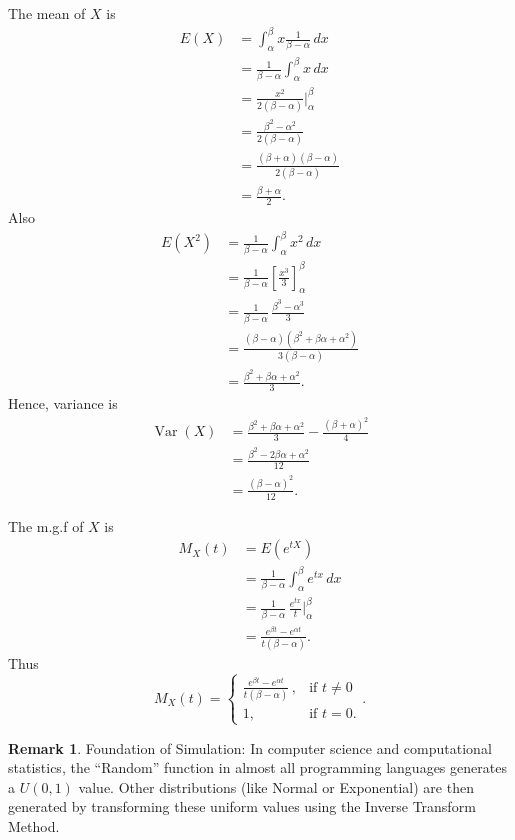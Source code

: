 \documentclass[12pt,a4paper]{report}
\theoremstyle{definition}
\newtheorem{remark}[thm]{Remark}
\theoremstyle{plain}
\theoremstyle{definition}
\begin{document}
The mean of $X$ is
\begin{align*}
E(X) &=\int^{\beta}_{\alpha}x\frac{1}{\beta -\alpha}\, dx\\
&=\frac{1}{\beta -\alpha}\int^{\beta}_{\alpha}x\, dx\\
&=\frac{x^2}{2(\beta -\alpha)}\Bigg|_{\alpha}^{\beta}\\
&=\frac{\beta^2-\alpha^2}{2(\beta -\alpha)}\\
&=\frac{(\beta +\alpha)(\beta-\alpha)}{2(\beta-\alpha)}\\
& =\frac{\beta +\alpha}{2}.
\end{align*}
Also
\begin{align*}
E(X^2) & = \frac{1}{\beta - \alpha}\int^{\beta}_{\alpha} x^2\,dx\\
& = \frac{1}{\beta - \alpha}\left[\frac{x^3}{3}\right]^{\beta}_{\alpha}\\
& = \frac{1}{\beta-\alpha}\, \frac{\beta^3-\alpha^3}{3}\\
& = \frac{(\beta - \alpha)(\beta^2 + \beta \alpha + \alpha^2)}{3(\beta - \alpha)}\\
& = \frac{\beta^2 + \beta \alpha + \alpha^2}{3}.
\end{align*}
Hence, variance is
\begin{align*}
\operatorname{Var}(X) & = \frac{\beta^2 + \beta \alpha + \alpha^2}{3}- \frac{(\beta + \alpha)^2}{4}\\
& = \frac{\beta^2 - 2\beta \alpha + \alpha^2}{12}\\
& = \frac{(\beta - \alpha)^2}{12}.
\end{align*}

The m.g.f of $X$ is 
\begin{align*}
M_X(t) &=E\left(e^{tX}\right)\\
&=\frac{1}{\beta -\alpha}\int^{\beta}_{\alpha}e^{tx}\, dx\\
& =\frac{1}{\beta -\alpha}\,\frac{e^{tx}}{t}\Bigg|_{\alpha}^{\beta}\\
 &=\frac{e^{\beta t}-e^{\alpha t}}{t(\beta-\alpha)}.
\end{align*}
Thus \[M_X(t)= \begin{cases}
\frac{e^{\beta t}-e^{\alpha t}}{t(\beta-\alpha)}\, , & \text{if}\,\, t \neq 0\\
1, & \text{if}\,\, t = 0.
\end{cases}.\]

\begin{remark}
Foundation of Simulation: In computer science and computational statistics, the ``Random'' function in almost all programming languages generates a $U(0, 1)$ value. Other distributions (like Normal or Exponential) are then generated by transforming these uniform values using the Inverse Transform Method.
\end{remark}
\end{document}

